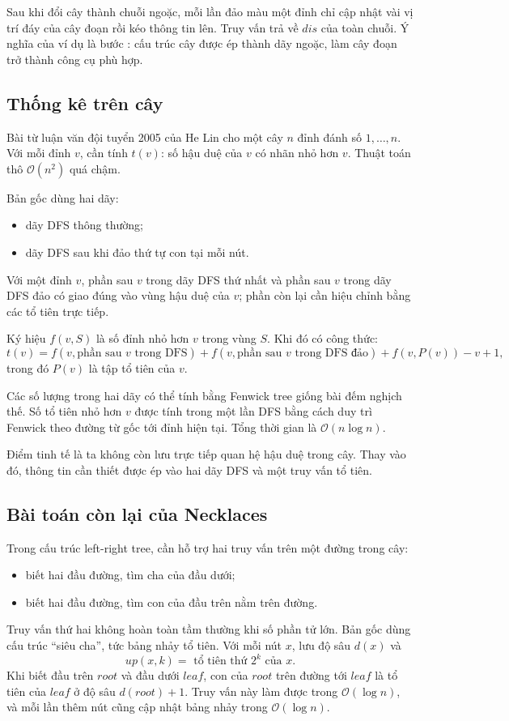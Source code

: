 \documentclass[11pt]{article}
\newcommand{\Oh}{\mathcal{O}}
\begin{document}
Sau khi đổi cây thành chuỗi ngoặc, mỗi lần đảo màu một đỉnh chỉ cập nhật vài
vị trí đáy của cây đoạn rồi kéo thông tin lên. Truy vấn trả về \(dis\) của
toàn chuỗi. Ý nghĩa của ví dụ là bước : cấu trúc cây được ép thành
dãy ngoặc, làm cây đoạn trở thành công cụ phù hợp.

\subsection{Thống kê trên cây}

Bài từ luận văn đội tuyển 2005 của He Lin cho một cây \(n\) đỉnh đánh số
\(1,\ldots,n\). Với mỗi đỉnh \(v\), cần tính \(t(v)\): số hậu duệ của \(v\) có
nhãn nhỏ hơn \(v\). Thuật toán thô \(\Oh(n^2)\) quá chậm.

Bản gốc dùng hai dãy:
\begin{itemize}
  \item dãy DFS thông thường;
  \item dãy DFS sau khi đảo thứ tự con tại mỗi nút.
\end{itemize}
Với một đỉnh \(v\), phần sau \(v\) trong dãy DFS thứ nhất và phần sau \(v\)
trong dãy DFS đảo có giao đúng vào vùng hậu duệ của \(v\); phần còn lại cần
hiệu chỉnh bằng các tổ tiên trực tiếp.

Ký hiệu \(f(v,S)\) là số đỉnh nhỏ hơn \(v\) trong vùng \(S\). Khi đó có công
thức:
\[
t(v)=
f(v,\text{phần sau }v\text{ trong DFS})
+f(v,\text{phần sau }v\text{ trong DFS đảo})
+f(v,P(v))-v+1,
\]
trong đó \(P(v)\) là tập tổ tiên của \(v\).

Các số lượng trong hai dãy có thể tính bằng Fenwick tree giống bài đếm nghịch
thế. Số tổ tiên nhỏ hơn \(v\) được tính trong một lần DFS bằng cách duy trì
Fenwick theo đường từ gốc tới đỉnh hiện tại. Tổng thời gian là
\(\Oh(n\log n)\).

Điểm tinh tế là ta không còn lưu trực tiếp quan hệ hậu duệ trong cây. Thay vào
đó, thông tin cần thiết được ép vào hai dãy DFS và một truy vấn tổ tiên.

\subsection{Bài toán còn lại của Necklaces}

Trong cấu trúc left-right tree, cần hỗ trợ hai truy vấn trên một đường trong
cây:
\begin{itemize}
  \item biết hai đầu đường, tìm cha của đầu dưới;
  \item biết hai đầu đường, tìm con của đầu trên nằm trên đường.
\end{itemize}
Truy vấn thứ hai không hoàn toàn tầm thường khi số phần tử lớn. Bản gốc dùng
cấu trúc ``siêu cha'', tức bảng nhảy tổ tiên. Với mỗi nút \(x\), lưu độ sâu
\(d(x)\) và
\[
  up(x,k)=\text{ tổ tiên thứ }2^k\text{ của }x.
\]
Khi biết đầu trên \(root\) và đầu dưới \(leaf\), con của \(root\) trên đường
tới \(leaf\) là tổ tiên của \(leaf\) ở độ sâu \(d(root)+1\). Truy vấn này làm
được trong \(\Oh(\log n)\), và mỗi lần thêm nút cũng cập nhật bảng nhảy trong
\(\Oh(\log n)\).
\end{document}
